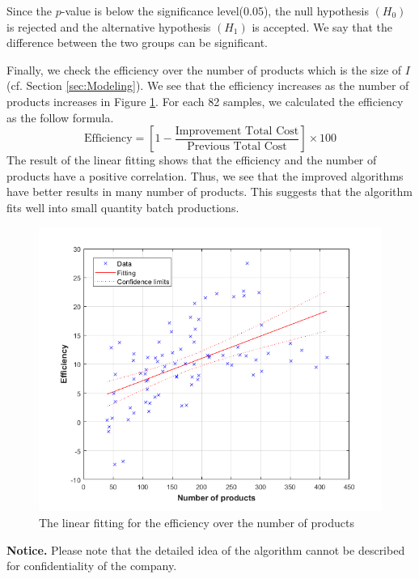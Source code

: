 \documentclass[a4paper]{amsart}
\numberwithin{equation}{section} %
\numberwithin{figure}{section} %
\numberwithin{table}{section}
\theoremstyle{plain}
\theoremstyle{definition}
\theoremstyle{plain}
\theoremstyle{plain}
\theoremstyle{plain}
\theoremstyle{plain}
\theoremstyle{plain}
\begin{document}
Since the $p$-value is below the significance level(0.05), the null hypothesis $(H_{0})$ is rejected and the alternative hypothesis $(H_{1})$ is accepted. We say that the difference between the two groups can be significant.

Finally, we check the efficiency over the number of products which is the size of $I$(cf. Section \ref{sec:Modeling}).
We see that the efficiency increases as the number of products increases in Figure \ref{fig:LinearFitting}.
For each 82 samples, we calculated the efficiency as the follow formula.
\begin{equation}
	\textrm{Efficiency} = \left[1-\frac{\textrm{Improvement~Total~Cost}}{\textrm{Previous~Total~Cost}}\right]\times 100
\end{equation}
The result of the linear fitting shows that the efficiency and the number of products have a positive correlation.
Thus, we see that the improved algorithms have better results in many number of products.
This suggests that the algorithm fits well into small quantity batch productions.


\begin{figure}[h!]
	\centering
	\includegraphics[width=\linewidth]{Graph_3.png}
	\caption{The linear fitting for the efficiency over the number of products}
	\label{fig:LinearFitting}       %
\end{figure}


{\bf Notice.} Please note that the detailed idea of the algorithm cannot be described for confidentiality of the company.

~\\



\end{document}
